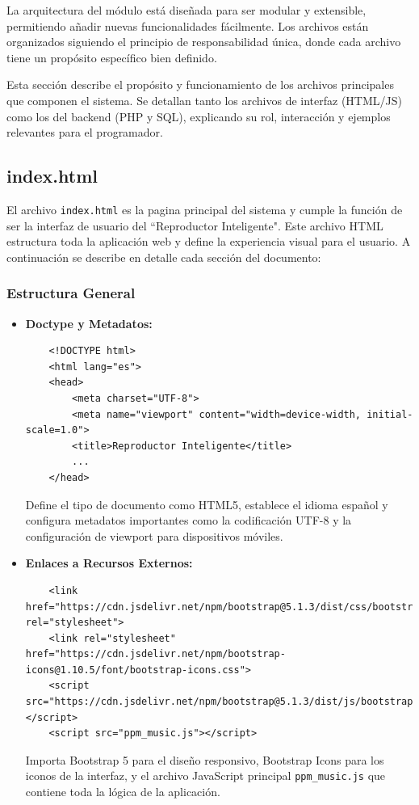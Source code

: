 \documentclass[a4paper,12pt]{article}
\begin{document}
La arquitectura del módulo está diseñada para ser modular y extensible, permitiendo añadir nuevas funcionalidades fácilmente. Los archivos están organizados siguiendo el principio de responsabilidad única, donde cada archivo tiene un propósito específico bien definido.

Esta sección describe el propósito y funcionamiento de los archivos principales que componen el sistema. Se detallan tanto los archivos de interfaz (HTML/JS) como los del backend (PHP y SQL), explicando su rol, interacción y ejemplos relevantes para el programador.

\subsection{index.html}
El archivo \texttt{index.html} es la pagina principal del sistema y cumple la función de ser la interfaz de usuario del ``Reproductor Inteligente". Este archivo HTML estructura toda la aplicación web y define la experiencia visual para el usuario. A continuación se describe en detalle cada sección del documento:

\subsubsection{Estructura General}
\begin{itemize}
    \item \textbf{Doctype y Metadatos:}
    \begin{verbatim}
    <!DOCTYPE html>
    <html lang="es">
    <head>
        <meta charset="UTF-8">
        <meta name="viewport" content="width=device-width, initial-scale=1.0">
        <title>Reproductor Inteligente</title>
        ...
    </head>
    \end{verbatim}
    Define el tipo de documento como HTML5, establece el idioma español y configura metadatos importantes como la codificación UTF-8 y la configuración de viewport para dispositivos móviles.

    \item \textbf{Enlaces a Recursos Externos:}
    \begin{verbatim}
    <link href="https://cdn.jsdelivr.net/npm/bootstrap@5.1.3/dist/css/bootstrap.min.css" rel="stylesheet">
    <link rel="stylesheet" href="https://cdn.jsdelivr.net/npm/bootstrap-icons@1.10.5/font/bootstrap-icons.css">
    <script src="https://cdn.jsdelivr.net/npm/bootstrap@5.1.3/dist/js/bootstrap.bundle.min.js"></script>
    <script src="ppm_music.js"></script>
    \end{verbatim}
    Importa Bootstrap 5 para el diseño responsivo, Bootstrap Icons para los iconos de la interfaz, y el archivo JavaScript principal \texttt{ppm\_music.js} que contiene toda la lógica de la aplicación.
\end{itemize}
\end{document}
